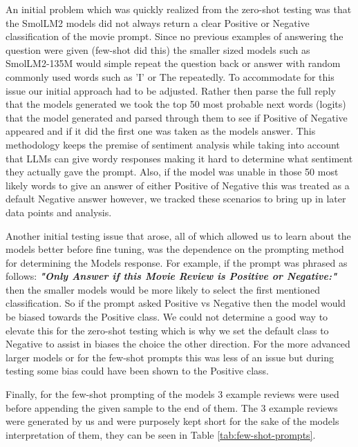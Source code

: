 \documentclass[10pt,twocolumn,letterpaper]{article}
\begin{document}
An initial problem which was quickly realized from the zero-shot testing was that the SmolLM2 models did not always return a clear Positive or Negative classification of the movie prompt. Since no previous examples of answering the question were given (few-shot did this) the smaller sized models such as SmolLM2-135M would simple repeat the question back or answer with random commonly used words such as 'I' or The repeatedly. To accommodate for this issue our initial approach had to be adjusted. Rather then parse the full reply that the models generated we took the top 50 most probable next words (logits) that the model generated and parsed through them to see if Positive of Negative appeared and if it did the first one was taken as the models answer. This methodology keeps the premise of sentiment analysis while taking into account that LLMs can give wordy responses making it hard to determine what sentiment they actually gave the prompt. Also, if the model was unable in those 50 most likely words to give an answer of either Positive of Negative this was treated as a default Negative answer however, we tracked these scenarios to bring up in later data points and analysis. 

Another initial testing issue that arose, all of which allowed us to learn about the models better before fine tuning, was the dependence on the prompting method for determining the Models response. For example, if the prompt was phrased as follows: \textit{\textbf{"Only Answer if this Movie Review is Positive or Negative:"}} then the smaller models would be more likely to select the first mentioned classification. So if the prompt asked Positive vs Negative then the model would be biased towards the Positive class. We could not determine a good way to elevate this for the zero-shot testing which is why we set the default class to Negative to assist in biases the choice the other direction. For the more advanced larger models or for the few-shot prompts this was less of an issue but during testing some bias could have been shown to the Positive class. 

Finally, for the few-shot prompting of the models 3 example reviews were used before appending the given sample to the end of them. The 3 example reviews were generated by us and were purposely kept short for the sake of the models interpretation of them, they can be seen in Table \ref{tab:few-shot-prompts}.
\end{document}
